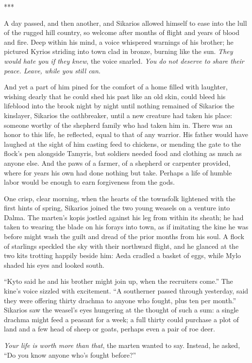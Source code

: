 ***

A day passed, and then another, and Sikarios allowed himself to ease into the lull of the rugged hill country, so welcome after months of flight and years of blood and fire. Deep within his mind, a voice whispered warnings of his brother; he pictured Kyrios striding into town clad in bronze, burning like the sun. \emph{They would hate you if they knew}, the voice snarled. \emph{You do not deserve to share their peace. Leave, while you still can}.

And yet a part of him pined for the comfort of a home filled with laughter, wishing dearly that he could shed his past like an old skin, could bleed his lifeblood into the brook night by night until nothing remained of Sikarios the kinslayer, Sikarios the oathbreaker, until a new creature had taken his place: someone worthy of the shepherd family who had taken him in. There was an honor to this life, he reflected, equal to that of any warrior. His father would have laughed at the sight of him casting feed to chickens, or mending the gate to the flock's pen alongside Tamyris, but soldiers needed food and clothing as much as anyone else. And the paws of a farmer, of a shepherd or carpenter provided, where for years his own had done nothing but take. Perhaps a life of humble labor would be enough to earn forgiveness from the gods.

One crisp, clear morning, when the hearts of the townsfolk lightened with the first hints of spring, Sikarios joined the two young weasels on a venture into Dalma. The marten's kopis jostled against his leg from within its sheath; he had taken to wearing the blade on his forays into town, as if imitating the kine he was before might wash the guilt and dread of the prior months from his soul. A flock of starlings speckled the sky with their northward flight, and he glanced at the two kits trotting happily beside him: Aeda cradled a basket of eggs, while Mylo shaded his eyes and looked south.

``Kyto said he and his brother might join up, when the recruiters come.'' The kine's voice sizzled with excitement. ``A southerner passed through yesterday, said they were offering thirty drachma to anyone who fought, plus ten per month.'' Sikarios saw the weasel's eyes hungering at the thought of such a sum: a single drachma might feed a peasant for a week; a full thirty could purchase a plot of land and a few head of sheep or goats, perhaps even a pair of roe deer.

\emph{Your life is worth more than that}, the marten wanted to say. Instead, he asked, ``Do you know anyone who's fought before?''

